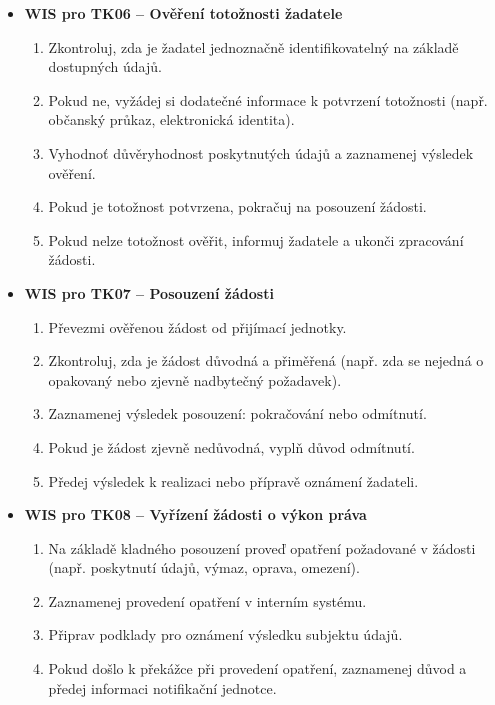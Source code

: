 \begin{itemize}
\begin{itemize}
  \item \textbf{WIS pro TK06 – Ověření totožnosti žadatele}
  \begin{enumerate}
    \item Zkontroluj, zda je žadatel jednoznačně identifikovatelný na základě dostupných údajů.
    \item Pokud ne, vyžádej si dodatečné informace k potvrzení totožnosti (např. občanský průkaz, elektronická identita).
    \item Vyhodnoť důvěryhodnost poskytnutých údajů a zaznamenej výsledek ověření.
    \item Pokud je totožnost potvrzena, pokračuj na posouzení žádosti.
    \item Pokud nelze totožnost ověřit, informuj žadatele a ukonči zpracování žádosti.
  \end{enumerate}

  \item \textbf{WIS pro TK07 – Posouzení žádosti}
  \begin{enumerate}
    \item Převezmi ověřenou žádost od přijímací jednotky.
    \item Zkontroluj, zda je žádost důvodná a přiměřená (např. zda se nejedná o opakovaný nebo zjevně nadbytečný požadavek).
    \item Zaznamenej výsledek posouzení: pokračování nebo odmítnutí.
    \item Pokud je žádost zjevně nedůvodná, vyplň důvod odmítnutí.
    \item Předej výsledek k realizaci nebo přípravě oznámení žadateli.
  \end{enumerate}

  \item \textbf{WIS pro TK08 – Vyřízení žádosti o výkon práva}
  \begin{enumerate}
    \item Na základě kladného posouzení proveď opatření požadované v žádosti (např. poskytnutí údajů, výmaz, oprava, omezení).
    \item Zaznamenej provedení opatření v interním systému.
    \item Připrav podklady pro oznámení výsledku subjektu údajů.
    \item Pokud došlo k překážce při provedení opatření, zaznamenej důvod a předej informaci notifikační jednotce.
  \end{enumerate}


\end{itemize}
\end{itemize}
